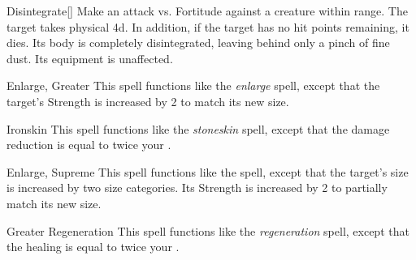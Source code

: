 \lowercase{\hypertarget{spell:Disintegrate}{}}\label{spell:Disintegrate}
\begin{ability}[\nth{5}]{\hypertarget{spell:Disintegrate}{Disintegrate}}[]
Make an attack vs. Fortitude against a creature within \rngmed range.
\hit The target takes physical  \plus4d.
In addition, if the target has no hit points remaining, it dies.
Its body is completely disintegrated, leaving behind only a pinch of fine dust.
Its equipment is unaffected.
\end{ability}
\vspace{0.25em}



\lowercase{\hypertarget{spell:Enlarge, Greater}{}}\label{spell:Enlarge, Greater}
\begin{ability}[\nth{5}]{\hypertarget{spell:Enlarge, Greater}{Enlarge, Greater}}
This spell functions like the \textit{enlarge} spell, except that the target's Strength is increased by 2 to match its new size.
\end{ability}
\vspace{0.25em}



\lowercase{\hypertarget{spell:Ironskin}{}}\label{spell:Ironskin}
\begin{ability}[\nth{6}]{\hypertarget{spell:Ironskin}{Ironskin}}
This spell functions like the \textit{stoneskin} spell, except that the damage reduction is equal to twice your .
\end{ability}
\vspace{0.25em}



\lowercase{\hypertarget{spell:Enlarge, Supreme}{}}\label{spell:Enlarge, Supreme}
\begin{ability}[\nth{7}]{\hypertarget{spell:Enlarge, Supreme}{Enlarge, Supreme}}
This spell functions like the  spell, except that the target's size is increased by two size categories.
Its Strength is increased by 2 to partially match its new size.
\end{ability}
\vspace{0.25em}



\lowercase{\hypertarget{spell:Greater Regeneration}{}}\label{spell:Greater Regeneration}
\begin{ability}[\nth{7}]{\hypertarget{spell:Greater Regeneration}{Greater Regeneration}}
This spell functions like the \textit{regeneration} spell, except that the healing is equal to twice your .
\end{ability}
\vspace{0.25em}




